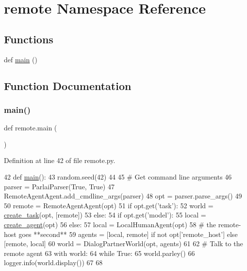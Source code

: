 \hypertarget{namespaceremote}{}\section{remote Namespace Reference}
\label{namespaceremote}
\subsection*{Functions}
\begin{DoxyCompactItemize}
\item 
def \hyperlink{namespaceremote_aa8eb15effdae452b1fde3639cd9bc267}{main} ()
\end{DoxyCompactItemize}


\subsection{Function Documentation}
\mbox{\label{namespaceremote_aa8eb15effdae452b1fde3639cd9bc267}} 
\subsubsection{\texorpdfstring{main()}{main()}}
{\footnotesize\ttfamily def remote.\+main (\begin{DoxyParamCaption}{ }\end{DoxyParamCaption})}



Definition at line 42 of file remote.\+py.


\begin{DoxyCode}
42 \textcolor{keyword}{def }\hyperlink{namespaceremote_aa8eb15effdae452b1fde3639cd9bc267}{main}():
43     random.seed(42)
44 
45     \textcolor{comment}{# Get command line arguments}
46     parser = ParlaiParser(\textcolor{keyword}{True}, \textcolor{keyword}{True})
47     RemoteAgentAgent.add\_cmdline\_args(parser)
48     opt = parser.parse\_args()
49 
50     remote = RemoteAgentAgent(opt)
51     \textcolor{keywordflow}{if} opt.get(\textcolor{stringliteral}{'task'}):
52         world = \hyperlink{namespaceparlai_1_1core_1_1worlds_a79969c7ba76d4b3c500f5bb776444dc6}{create\_task}(opt, [remote])
53     \textcolor{keywordflow}{else}:
54         \textcolor{keywordflow}{if} opt.get(\textcolor{stringliteral}{'model'}):
55             local = \hyperlink{namespaceparlai_1_1core_1_1agents_a00d77a7e26fb89e8bd900f7b2a02982a}{create\_agent}(opt)
56         \textcolor{keywordflow}{else}:
57             local = LocalHumanAgent(opt)
58         \textcolor{comment}{# the remote-host goes **second**}
59         agents = [local, remote] \textcolor{keywordflow}{if} \textcolor{keywordflow}{not} opt[\textcolor{stringliteral}{'remote\_host'}] \textcolor{keywordflow}{else} [remote, local]
60         world = DialogPartnerWorld(opt, agents)
61 
62     \textcolor{comment}{# Talk to the remote agent}
63     with world:
64         \textcolor{keywordflow}{while} \textcolor{keyword}{True}:
65             world.parley()
66             logger.info(world.display())
67 
68 
\end{DoxyCode}
